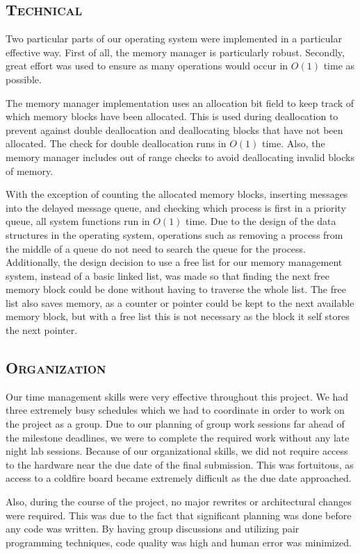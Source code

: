 \documentclass[oneside]{report}
\begin{document}
\subsection{\textsc{Technical}}

Two particular parts of our operating system were implemented in a particular
effective way. First of all, the memory manager is particularly robust.
Secondly, great effort was used to ensure as many operations would occur in 
$O(1)$ time as possible.

The memory manager implementation uses an allocation bit field to keep track of
which memory blocks have been allocated. This is used during deallocation to
prevent against double deallocation and deallocating blocks that have not been
allocated. The check for double deallocation runs in $O(1)$ time. Also, the
memory manager includes out of range checks to avoid deallocating invalid
blocks of memory.

With the exception of counting the allocated memory blocks, inserting messages
into the delayed message queue, and checking which process is first in a
priority queue, all system functions run in $O(1)$ time. Due to the design of
the data structures in the operating system, operations such as removing a
process from the middle of a queue do not need to search the queue for the
process. Additionally, the design decision to use a free list for our memory 
management system, instead of a basic linked list, was made so that finding the 
next free memory block could be done without having to traverse the whole list. 
The free list also saves memory, as a counter or pointer could be kept to the 
next available memory block, but with a free list this is not necessary as the 
block it self stores the next pointer.

\subsection{\textsc{Organization}}

Our time management skills were very effective throughout this project. We had
three extremely busy schedules which we had to coordinate in order to work on
the project as a group. Due to our planning of group work sessions far ahead of
the milestone deadlines, we were to complete the required work without any late
night lab sessions. Because of our organizational skills, we did not require
access to the hardware near the due date of the final submission. This was
fortuitous, as access to a coldfire board became extremely difficult as the due
date approached.

Also, during the course of the project, no major rewrites or architectural
changes were required. This was due to the fact that significant planning was
done before any code was written. By having group discussions and utilizing
pair programming techniques, code quality was high and human error was
minimized.
\end{document}
